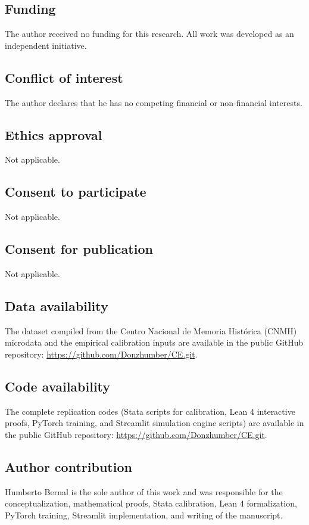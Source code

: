 \documentclass[pdflatex,sn-mathphys-ay]{sn-jnl}
\theoremstyle{plain}
\theoremstyle{definition}
\newcommand{\1}{\mathbf{1}}
\begin{document}
\subsection*{Funding}
The author received no funding for this research. All work was developed as an independent initiative.

\subsection*{Conflict of interest}
The author declares that he has no competing financial or non-financial interests.

\subsection*{Ethics approval}
Not applicable.

\subsection*{Consent to participate}
Not applicable.

\subsection*{Consent for publication}
Not applicable.

\subsection*{Data availability}
The dataset compiled from the Centro Nacional de Memoria Histórica (CNMH) microdata and the empirical calibration inputs are available in the public GitHub repository: \url{https://github.com/Donzhumber/CE.git}.

\subsection*{Code availability}
The complete replication codes (Stata scripts for calibration, Lean 4 interactive proofs, PyTorch training, and Streamlit simulation engine scripts) are available in the public GitHub repository: \url{https://github.com/Donzhumber/CE.git}.

\subsection*{Author contribution}
Humberto Bernal is the sole author of this work and was responsible for the conceptualization, mathematical proofs, Stata calibration, Lean 4 formalization, PyTorch training, Streamlit implementation, and writing of the manuscript.


\end{document}
